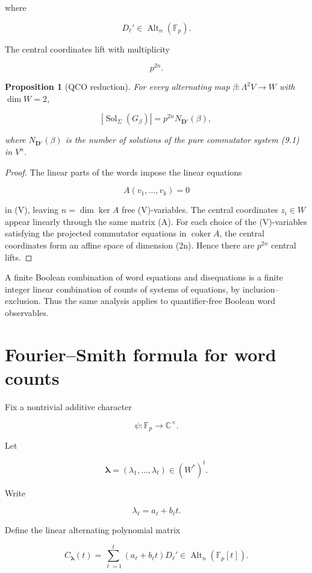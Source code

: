 \documentclass[11pt]{article}
\newtheorem{proposition}[theorem]{Proposition}
\begin{document}
where

\[
D_\ell'\in\operatorname{Alt}_n(\mathbb F_p).
\]

The central coordinates lift with multiplicity

\[
p^{2n}.
\]

\begin{proposition}[QCO reduction]
For every alternating map $\beta: \Lambda^2V\to W$ with $\dim W=2$,

\[
|\operatorname{Sol}_{\Sigma}(G_\beta)|
=p^{2n}N_{\mathbf D'}(\beta),
\tag{9.2}
\]

where $N_{\mathbf D'}(\beta)$ is the number of solutions of the pure commutator system (9.1) in $V^n$.

\end{proposition}

\begin{proof}
The linear parts of the words impose the linear equations

\[
A(v_1,\ldots,v_k)=0
\]

in (V), leaving $n=\dim\ker A$ free (V)-variables. The central coordinates $z_i\in W$ appear linearly through the same matrix (A). For each choice of the (V)-variables satisfying the projected commutator equations in $\operatorname{coker}A$, the central coordinates form an affine space of dimension (2n). Hence there are $p^{2n}$ central lifts.

\end{proof}

A finite Boolean combination of word equations and disequations is a finite integer linear combination of counts of systems of equations, by inclusion--exclusion. Thus the same analysis applies to quantifier-free Boolean word observables.

\section{Fourier--Smith formula for word counts}

Fix a nontrivial additive character

\[
\psi:\mathbb F_p\to\mathbb C^\times.
\]

Let

\[
\boldsymbol\lambda=(\lambda_1,\ldots,\lambda_t)\in (W^*)^t.
\]

Write

\[
\lambda_\ell=a_\ell+b_\ell t.
\]

Define the linear alternating polynomial matrix

\[
C_{\boldsymbol\lambda}(t)
=\sum_{\ell=1}^t
(a_\ell+b_\ell t)D_\ell'
\in
\operatorname{Alt}_n(\mathbb F_p[t]).
\tag{10.1}
\]
\end{document}
